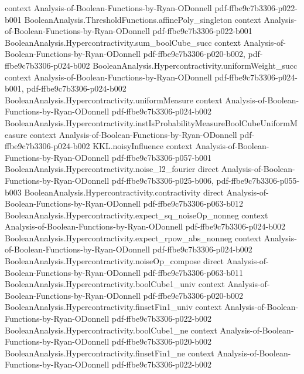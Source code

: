 \begin{theorem}
  {context}
  {Analysis-of-Boolean-Functions-by-Ryan-ODonnell}
  {pdf-ffbe9c7b3306-p022-b001}
\proofstep
  {BooleanAnalysis.ThresholdFunctions.affinePoly_singleton}
  {context}
  {Analysis-of-Boolean-Functions-by-Ryan-ODonnell}
  {pdf-ffbe9c7b3306-p022-b001}
\proofstep
  {BooleanAnalysis.Hypercontractivity.sum_boolCube_succ}
  {context}
  {Analysis-of-Boolean-Functions-by-Ryan-ODonnell}
  {pdf-ffbe9c7b3306-p020-b002,
    pdf-ffbe9c7b3306-p024-b002}
\proofstep
  {BooleanAnalysis.Hypercontractivity.uniformWeight_succ}
  {context}
  {Analysis-of-Boolean-Functions-by-Ryan-ODonnell}
  {pdf-ffbe9c7b3306-p024-b001,
    pdf-ffbe9c7b3306-p024-b002}
\proofstep
  {BooleanAnalysis.Hypercontractivity.uniformMeasure}
  {context}
  {Analysis-of-Boolean-Functions-by-Ryan-ODonnell}
  {pdf-ffbe9c7b3306-p024-b002}
\proofstep
  {BooleanAnalysis.Hypercontractivity.instIsProbabilityMeasureBoolCubeUniformMeasure}
  {context}
  {Analysis-of-Boolean-Functions-by-Ryan-ODonnell}
  {pdf-ffbe9c7b3306-p024-b002}
\proofstep
  {KKL.noisyInfluence}
  {context}
  {Analysis-of-Boolean-Functions-by-Ryan-ODonnell}
  {pdf-ffbe9c7b3306-p057-b001}
\proofstep
  {BooleanAnalysis.Hypercontractivity.noise_l2_fourier}
  {direct}
  {Analysis-of-Boolean-Functions-by-Ryan-ODonnell}
  {pdf-ffbe9c7b3306-p025-b006,
    pdf-ffbe9c7b3306-p055-b003}
\proofstep
  {BooleanAnalysis.Hypercontractivity.contractivity}
  {direct}
  {Analysis-of-Boolean-Functions-by-Ryan-ODonnell}
  {pdf-ffbe9c7b3306-p063-b012}
\proofstep
  {BooleanAnalysis.Hypercontractivity.expect_sq_noiseOp_nonneg}
  {context}
  {Analysis-of-Boolean-Functions-by-Ryan-ODonnell}
  {pdf-ffbe9c7b3306-p024-b002}
\proofstep
  {BooleanAnalysis.Hypercontractivity.expect_rpow_abs_nonneg}
  {context}
  {Analysis-of-Boolean-Functions-by-Ryan-ODonnell}
  {pdf-ffbe9c7b3306-p024-b002}
\proofstep
  {BooleanAnalysis.Hypercontractivity.noiseOp_compose}
  {direct}
  {Analysis-of-Boolean-Functions-by-Ryan-ODonnell}
  {pdf-ffbe9c7b3306-p063-b011}
\proofstep
  {BooleanAnalysis.Hypercontractivity.boolCube1_univ}
  {context}
  {Analysis-of-Boolean-Functions-by-Ryan-ODonnell}
  {pdf-ffbe9c7b3306-p020-b002}
\proofstep
  {BooleanAnalysis.Hypercontractivity.finsetFin1_univ}
  {context}
  {Analysis-of-Boolean-Functions-by-Ryan-ODonnell}
  {pdf-ffbe9c7b3306-p022-b002}
\proofstep
  {BooleanAnalysis.Hypercontractivity.boolCube1_ne}
  {context}
  {Analysis-of-Boolean-Functions-by-Ryan-ODonnell}
  {pdf-ffbe9c7b3306-p020-b002}
\proofstep
  {BooleanAnalysis.Hypercontractivity.finsetFin1_ne}
  {context}
  {Analysis-of-Boolean-Functions-by-Ryan-ODonnell}
  {pdf-ffbe9c7b3306-p022-b002}

\end{theorem}
